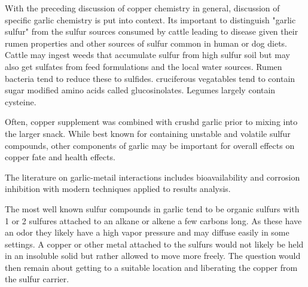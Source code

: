 
With the preceding discussion of copper chemistry in general,
discussion of specific garlic chemistry is put into context.
Its important to distinguish "garlic sulfur" from the
sulfur sources consumed by cattle leading to disease
given their rumen properties and other sources of sulfur
common in human or dog diets. Cattle may ingest weeds that
accumulate sulfur from high sulfur soil but may also get
sulfates from feed formulations and the local water
sources. Rumen bacteria tend to reduce these to sulfides.
cruciferous vegatables tend to contain sugar modified amino acids
called glucosinolates. Legumes largely contain cysteine.
 



Often, copper supplement was combined with crushd garlic
prior to mixing into the larger snack. While best known
for containing unstable and volatile sulfur compounds,
other components of garlic may be important for overall
effects on copper fate and health effects.

The literature on garlic-metail interactions includes
bioavailability and corrosion inhibition with modern
techniques applied to results analysis. 


The most well known sulfur compounds in garlic tend to 
be organic sulfurs with 1 or 2 sulfures attached to an
alkane or alkene a few carbons long. As these have
an odor they likely have a high vapor pressure and
may diffuse easily in some settings. A copper or
other metal attached to the sulfurs would not likely
be held in an insoluble solid but rather allowed
to move more freely. The question would then remain
about getting to a suitable location and liberating
the copper from the sulfur carrier. 


